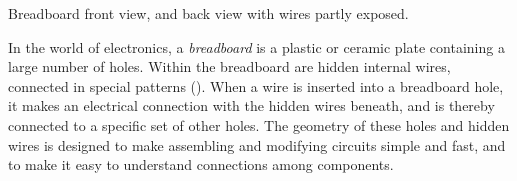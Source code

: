 \begin{marginfigure}[-10.cm]
\begin{center}
		\caption[Breadboard front/back]{Breadboard front view, and back view with wires partly exposed.}
	\end{center}
\end{marginfigure}
In the world of electronics, a \emph{breadboard} is a plastic or ceramic plate containing a large number of holes.
Within the breadboard are hidden internal wires, connected in special patterns ().
When a wire is inserted into a breadboard hole, it makes an electrical connection with the hidden wires beneath, and is thereby connected to a specific set of other holes. %
The geometry of these holes and hidden wires is designed to make assembling and modifying circuits simple and fast, and to make it easy to understand connections among components.

